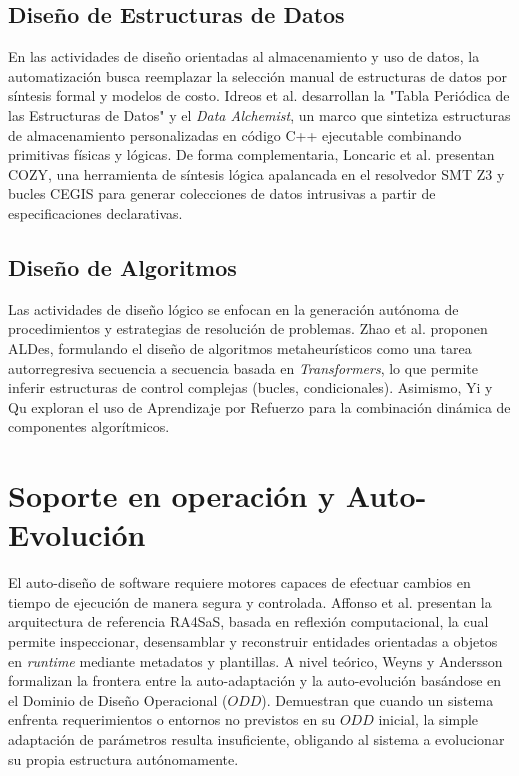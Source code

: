 \documentclass[12pt, letterpaper, oneside]{book}
\begin{document}
\subsection{Diseño de Estructuras de Datos} 
En las actividades de diseño orientadas al almacenamiento y uso de datos, la automatización busca reemplazar la selección manual de estructuras de datos por síntesis formal y modelos de costo. Idreos et al. \cite{StratosIdreos2019LearningData, idreos2018periodic} desarrollan la "Tabla Periódica de las Estructuras de Datos" y el \textit{Data Alchemist}, un marco que sintetiza estructuras de almacenamiento personalizadas en código C++ ejecutable combinando primitivas físicas y lógicas. De forma complementaria, Loncaric et al. \cite{loncaric2016Datastructure, loncaric2018Generalizeddata} presentan COZY, una herramienta de síntesis lógica apalancada en el resolvedor SMT Z3 y bucles CEGIS para generar colecciones de datos intrusivas a partir de especificaciones declarativas. 
\subsection{Diseño de Algoritmos} 
Las actividades de diseño lógico se enfocan en la generación autónoma de procedimientos y estrategias de resolución de problemas. Zhao et al. \cite{Zhao2025AutomatedMetaheuristic} proponen ALDes, formulando el diseño de algoritmos metaheurísticos como una tarea autorregresiva secuencia a secuencia basada en \textit{Transformers}, lo que permite inferir estructuras de control complejas (bucles, condicionales). Asimismo, Yi y Qu \cite{Yi2023Automatedalgorithm} exploran el uso de Aprendizaje por Refuerzo para la combinación dinámica de componentes algorítmicos. 
\section{Soporte en operación y Auto-Evolución} 
El auto-diseño de software requiere motores capaces de efectuar cambios en tiempo de ejecución de manera segura y controlada. Affonso et al. \cite{Affonso2024AReferenceArchitecture} presentan la arquitectura de referencia RA4SaS, basada en reflexión computacional, la cual permite inspeccionar, desensamblar y reconstruir entidades orientadas a objetos en \textit{runtime} mediante metadatos y plantillas. A nivel teórico, Weyns y Andersson \cite{WeynsDannyFromSelf-Adaptation} formalizan la frontera entre la auto-adaptación y la auto-evolución basándose en el Dominio de Diseño Operacional ($ODD$). Demuestran que cuando un sistema enfrenta requerimientos o entornos no previstos en su $ODD$ inicial, la simple adaptación de parámetros resulta insuficiente, obligando al sistema a evolucionar su propia estructura autónomamente. 
\end{document}
